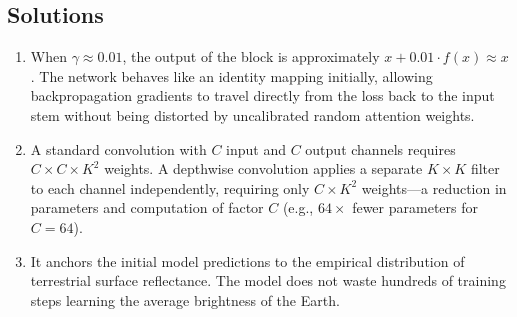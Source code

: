 \subsection*{Solutions}
\begin{enumerate}
    \item When $\gamma \approx 0.01$, the output of the block is approximately $x + 0.01 \cdot f(x) \approx x$. The network behaves like an identity mapping initially, allowing backpropagation gradients to travel directly from the loss back to the input stem without being distorted by uncalibrated random attention weights.
    \item A standard convolution with $C$ input and $C$ output channels requires $C \times C \times K^2$ weights. A depthwise convolution applies a separate $K \times K$ filter to each channel independently, requiring only $C \times K^2$ weights---a reduction in parameters and computation of factor $C$ (e.g., $64\times$ fewer parameters for $C=64$).
    \item It anchors the initial model predictions to the empirical distribution of terrestrial surface reflectance. The model does not waste hundreds of training steps learning the average brightness of the Earth.
\end{enumerate}
